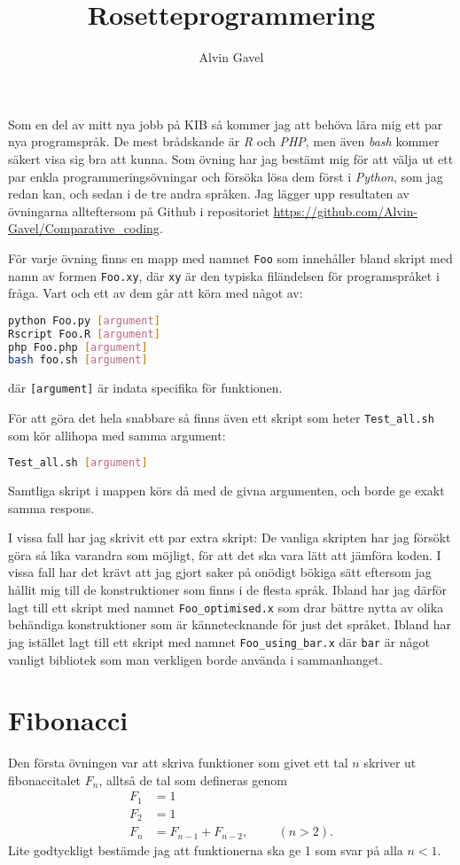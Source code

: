 \documentclass[10pt, twoside,a4paper]{article}
\title{Rosetteprogrammering}
\author{Alvin Gavel}
\date{}                                           %
\begin{document}
\maketitle

\noindent
Som en del av mitt nya jobb på KIB så kommer jag att behöva lära mig ett par nya programspråk. De mest brådskande är \emph{R} och \emph{PHP}, men även \emph{bash} kommer säkert visa sig bra att kunna. Som övning har jag bestämt mig för att välja ut ett par enkla programmeringsövningar och försöka lösa dem först i \emph{Python}, som jag redan kan, och sedan i de tre andra språken. Jag lägger upp resultaten av övningarna allteftersom på Github i repositoriet \url{https://github.com/Alvin-Gavel/Comparative_coding}.

För varje övning finns en mapp med namnet \verb+Foo+ som innehåller bland skript med namn av formen \verb+Foo.xy+, där \verb+xy+ är den typiska filändelsen för programspråket i fråga. Vart och ett av dem går att köra med något av:
\begin{lstlisting}[language=bash]
python Foo.py [argument]
Rscript Foo.R [argument]
php Foo.php [argument]
bash foo.sh [argument]
\end{lstlisting}
där \verb+[argument]+ är indata specifika för funktionen.

För att göra det hela snabbare så finns även ett skript som heter \verb+Test_all.sh+ som kör allihopa med samma argument:
\begin{lstlisting}[language=bash]
Test_all.sh [argument]
\end{lstlisting}
Samtliga skript i mappen körs då med de givna argumenten, och borde ge exakt samma respons.

I vissa fall har jag skrivit ett par extra skript: De vanliga skripten har jag försökt göra så lika varandra som möjligt, för att det ska vara lätt att jämföra koden. I vissa fall har det krävt att jag gjort saker på onödigt bökiga sätt eftersom jag hållit mig till de konstruktioner som finns i de flesta språk. Ibland har jag därför lagt till ett skript med namnet \verb+Foo_optimised.x+ som drar bättre nytta av olika behändiga konstruktioner som är kännetecknande för just det språket. Ibland har jag istället lagt till ett skript med namnet \verb+Foo_using_bar.x+ där \verb+bar+ är något vanligt bibliotek som man verkligen borde använda i sammanhanget.


\newpage
\section{Fibonacci}
Den första övningen var att skriva funktioner som givet ett tal $n$ skriver ut fibonaccitalet $F_n$, alltså de tal som defineras genom
\begin{align}
F_1 &= 1 \\
F_2 &= 1 \\
F_n &= F_{n-1} + F_{n-2}, \hspace{1cm}(n > 2).
\end{align}
Lite godtyckligt bestämde jag att funktionerna ska ge 1 som svar på alla $n < 1$.
\end{document}
